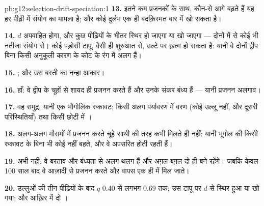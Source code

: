 \begin{solution}{pb:g12:selection-drift-speciation:1}
\textbf{13.} इतने कम प्रजनकों के साथ, कौन-से  आगे बढ़ते हैं यह
हर पीढ़ी में संयोग का मामला है; और कोई दुर्लभ  एक ही
बदक़िस्मत बार में खो सकता है।

\textbf{14.} $d$ अपवाहित होगा, और कुछ पीढ़ियों के भीतर स्थिर हो जाएगा या खो
जाएगा --- दोनों में से कोई भी नतीजा संयोग से। कोई पड़ोसी टापू, वैसी ही
शुरुआत से, उल्टे  पर ख़त्म हो सकता है: यानी वे दोनों द्वीप बिना
किसी अनुकूली कारण के कोट के रंग में अलग हैं।

\textbf{15.} ; और उस बस्ती का नन्हा आकार।

\textbf{16.} हाँ: वे द्वीप के चूहों से शायद ही प्रजनन करते हैं और उनके संकर
बंध्य हैं --- यानी प्रजनन अलगाव।

\textbf{17.} वह समुद्र, यानी एक भौगोलिक रुकावट; किसी अलग पर्यावरण में वरण
(कोई उल्लू नहीं, और दूसरी परिस्थितियाँ) तथा किसी छोटी  में ।

\textbf{18.} अलग-अलग मौसमों में प्रजनन करते चूहे साथी की तरह कभी मिलते ही
नहीं: यानी भूगोल की किसी रुकावट के बिना भी कोई  नहीं बहते, और वे 
अपसरित होती रहती हैं।

\textbf{19.} अभी नहीं: वे बरताव और बंध्यता से अलग-थलग हैं और अग़ल-बग़ल दो
 ही बने रहेंगे। जबकि केवल 100 साल बाद वे आज़ादी से प्रजनन करते और
वापस एक ही  में मिल जाते।

\textbf{20.} उल्लुओं की तीन पीढ़ियों के बाद $q$ 0.40 से लगभग 0.69 तक; उस
टापू पर $d$  से स्थिर हुआ या खो गया; और आख़िर में दो
।
\end{solution}
